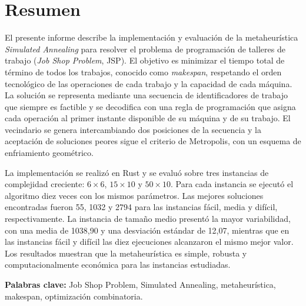 \chapter*{Resumen}
{}

El presente informe describe la implementación y evaluación de la metaheurística \emph{Simulated Annealing}
para resolver el problema de programación de talleres de trabajo
(\emph{Job Shop Problem}, JSP).
El objetivo es minimizar el tiempo total de término de todos los trabajos,
conocido como \emph{makespan},
respetando el orden tecnológico de las operaciones de cada trabajo y la capacidad de cada máquina.
La solución se representa mediante una secuencia de identificadores de trabajo que siempre es factible
y se decodifica con una regla de programación que asigna cada operación
al primer instante disponible de su máquina y de su trabajo.
El vecindario se genera intercambiando dos posiciones de la secuencia
y la aceptación de soluciones peores sigue el criterio de Metropolis,
con un esquema de enfriamiento geométrico.

La implementación se realizó en Rust y se evaluó sobre tres instancias de complejidad creciente:
\(6\times6\), \(15\times10\) y \(50\times10\).
Para cada instancia se ejecutó el algoritmo diez veces con los mismos parámetros.
Las mejores soluciones encontradas fueron 55, 1032 y 2794 para las instancias fácil, media y difícil, respectivamente.
La instancia de tamaño medio presentó la mayor variabilidad,
con una media de 1038{,}90 y una desviación estándar de 12{,}07,
mientras que en las instancias fácil y difícil las diez ejecuciones alcanzaron el mismo mejor valor.
Los resultados muestran que la metaheurística es simple,
robusta y computacionalmente económica para las instancias estudiadas.

{\bf Palabras clave:} Job Shop Problem, Simulated Annealing, metaheurística, makespan, optimización combinatoria.
